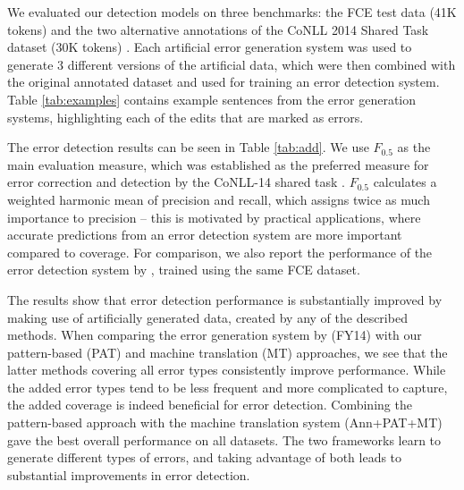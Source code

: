 \documentclass[11pt,letterpaper]{article}
\begin{document}
We evaluated our detection models on three benchmarks: the FCE test data (41K tokens) and the two alternative annotations of the CoNLL 2014 Shared Task dataset (30K tokens) \cite{Ng2013a}.
Each artificial error generation system was used to generate 3 different versions of the artificial data, which were then combined with the original annotated dataset and used for training an error detection system.
Table \ref{tab:examples} contains example sentences from the error generation systems, highlighting each of the edits that are marked as errors.



































The error detection results can be seen in Table \ref{tab:add}. We use $F_{0.5}$ as the main evaluation measure, which was established as the preferred measure for error correction and detection by the CoNLL-14 shared task \cite{Ng2013a}. $F_{0.5}$ calculates a weighted harmonic mean of precision and recall, which assigns twice as much importance to precision -- this is motivated by practical applications, where accurate predictions from an error detection system are more important compared to coverage. For comparison, we also report the performance of the error detection system by , trained using the same FCE dataset.

The results show that error detection performance is substantially improved by making use of artificially generated data, created by any of the described methods.
When comparing the error generation system by  (FY14) with our pattern-based (PAT) and machine translation (MT) approaches, we see that the latter methods covering all error types consistently improve performance. 
While the added error types tend to be less frequent and more complicated to capture, the added coverage is indeed beneficial for error detection.
Combining the pattern-based approach with the machine translation system (Ann+PAT+MT) gave the best overall performance on all datasets. The two frameworks learn to generate different types of errors, and taking advantage of both leads to substantial improvements in error detection.
\end{document}
